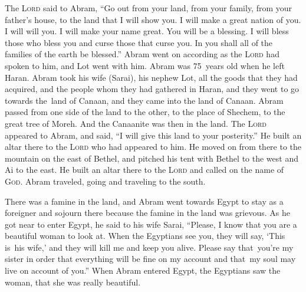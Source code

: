 
\begin{inparaenum}
     The \textsc{Lord} said to Abram, ``Go out from your land, from your family, from your father's house, to the land that I will show you.%
     I will make a great nation of you. I will will you. I will make your name great. You will be a blessing.%
     I will bless those who bless you and curse those that curse you. In you shall all of the families of the earth be blessed.''%
     Abram went on according as the \textsc{Lord} had spoken to him, and Lot went with him. Abram was 75~years old when he left Haran.%
     Abram took his wife (Sarai), his nephew Lot, all the goods that they had acquired, and the people whom they had gathered in Haran, and they went to go towards the\understood\ land of Canaan, and they came into the land of Canaan.%
     Abram passed from one side of the land to the other, to the place of Shechem, to the great tree of Moreh. And the Canaanite was then in the land.%
     The \textsc{Lord} appeared to Abram, and said, ``I will give this land to your posterity.'' He built an altar there to the \textsc{Lord} who had appeared to him.%
     He moved on from there to the mountain on the east of Bethel, and pitched his tent with Bethel to the west and Ai to the east. He built an altar there to the \textsc{Lord} and called on the name of \textsc{God}.%
     Abram traveled, going and traveling to the south.%
    
     There was a famine in the land, and Abram went towards Egypt to stay as a foreigner and sojourn there because the famine in the land was grievous.%
     As he got near to enter Egypt, he said to his wife Sarai, ``Please, I know that you are a beautiful woman to look at.%
     When the Egyptians see you, they will say, `This is\understood\ his wife,' and they will kill me and keep you alive.%
     Please say that\understood\ you're my sister in order that everything will be fine on my account and that\understood\ my soul may live on account of you.''%
     When Abram entered Egypt, the Egyptians saw the woman, that she was really beautiful.%
\end{inparaenum}
